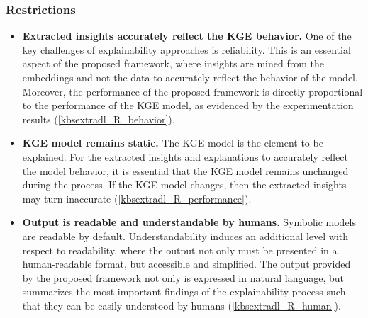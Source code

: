 \subsubsection*{Restrictions}
\begin{itemize}
    \item \textbf{Extracted insights accurately reflect the KGE behavior.} One of the key challenges of explainability approaches is reliability. This is an essential aspect of the proposed framework, where insights are mined from the embeddings and not the data to accurately reflect the behavior of the model. Moreover, the performance of the proposed framework is directly proportional to the performance of the KGE model, as evidenced by the experimentation results (\ref{kbsextradl_R_behavior}). 
    
    \item \textbf{KGE model remains static.} The KGE model is the element to be explained. For the extracted insights and explanations to accurately reflect the model behavior, it is essential that the KGE model remains unchanged during the process. If the KGE model changes, then the extracted insights may turn inaccurate (\ref{kbsextradl_R_performance}). 
    
    \item \textbf{Output is readable and understandable by humans.} Symbolic models are readable by default. Understandability induces an additional level with respect to readability, where the output not only must be presented in a human-readable format, but accessible and simplified. The output provided by the proposed framework not only is expressed in natural language, but summarizes the most important findings of the explainability process such that they can be easily understood by humans (\ref{kbsextradl_R_human}). 
\end{itemize}

